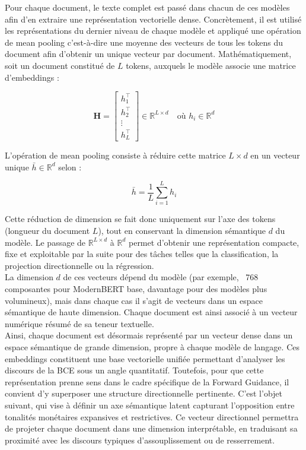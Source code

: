 Pour chaque document, le texte complet est passé dans chacun de ces modèles afin d’en extraire une représentation vectorielle dense. Concrètement, il est utilisé les représentations du dernier niveau de chaque modèle et appliqué une opération de mean pooling c’est-à-dire une moyenne des vecteurs de tous les tokens du document afin d’obtenir un unique vecteur par document. Mathématiquement, soit un document constitué de $L$ tokens, auxquels le modèle associe une matrice d’embeddings :

\begin{equation}
\mathbf{H} = \begin{bmatrix}
h_1^\top \\
h_2^\top \\
\vdots \\
h_L^\top
\end{bmatrix} \in \mathbb{R}^{L \times d}
\quad \text{où } h_i \in \mathbb{R}^d
\end{equation}

L’opération de mean pooling consiste à réduire cette matrice $L \times d$ en un vecteur unique $\bar{h} \in \mathbb{R}^d$ selon :

\begin{equation}
\bar{h} = \frac{1}{L} \sum_{i=1}^L h_i
\end{equation}

Cette réduction de dimension se fait donc uniquement sur l’axe des tokens (longueur du document $L$), tout en conservant la dimension sémantique $d$ du modèle. Le passage de $\mathbb{R}^{L \times d}$ à $\mathbb{R}^d$ permet d'obtenir une représentation compacte, fixe et exploitable par la suite pour des tâches telles que la classification, la projection directionnelle ou la régression.\\

La dimension $d$ de ces vecteurs dépend du modèle (par exemple, ~768 composantes pour ModernBERT base, davantage pour des modèles plus volumineux), mais dans chaque cas il s’agit de vecteurs dans un espace sémantique de haute dimension. Chaque document est ainsi associé à un vecteur numérique résumé de sa teneur textuelle.\\

Ainsi, chaque document est désormais représenté par un vecteur dense dans un espace sémantique de grande dimension, propre à chaque modèle de langage. Ces embeddings constituent une base vectorielle unifiée permettant d’analyser les discours de la BCE sous un angle quantitatif. Toutefois, pour que cette représentation prenne sens dans le cadre spécifique de la Forward Guidance, il convient d’y superposer une structure directionnelle pertinente. C’est l’objet suivant, qui vise à définir un axe sémantique latent capturant l’opposition entre tonalités monétaires expansives et restrictives. Ce vecteur directionnel permettra de projeter chaque document dans une dimension interprétable, en traduisant sa proximité avec les discours typiques d’assouplissement ou de resserrement.

